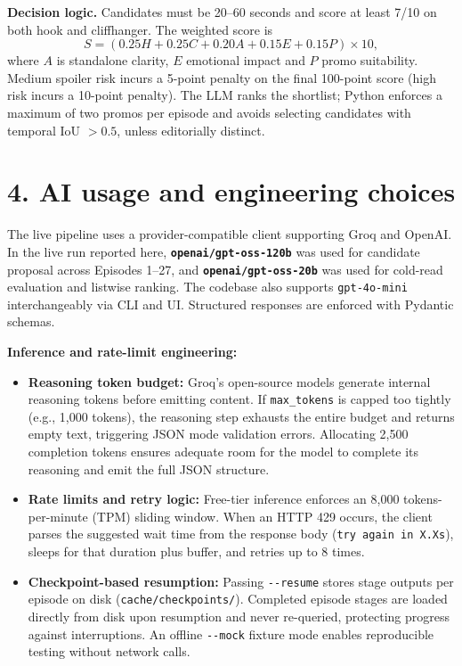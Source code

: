 \documentclass[10pt,a4paper]{extarticle}
\begin{document}
\textbf{Decision logic.} Candidates must be 20--60 seconds and score at least 7/10 on both hook and cliffhanger. The weighted score is
\[
S = (0.25H + 0.25C + 0.20A + 0.15E + 0.15P)\times 10,
\]
where \(A\) is standalone clarity, \(E\) emotional impact and \(P\) promo suitability. Medium spoiler risk incurs a 5-point penalty on the final 100-point score (high risk incurs a 10-point penalty). The LLM ranks the shortlist; Python enforces a maximum of two promos per episode and avoids selecting candidates with temporal IoU \(>0.5\), unless editorially distinct.

\section{4. AI usage and engineering choices}
The live pipeline uses a provider-compatible client supporting Groq and OpenAI. In the live run reported here, \textbf{\texttt{openai/gpt-oss-120b}} was used for candidate proposal across Episodes 1--27, and \textbf{\texttt{openai/gpt-oss-20b}} was used for cold-read evaluation and listwise ranking. The codebase also supports \texttt{gpt-4o-mini} interchangeably via CLI and UI. Structured responses are enforced with Pydantic schemas.

\textbf{Inference and rate-limit engineering:}
\begin{itemize}[leftmargin=*, nosep]
    \item \textbf{Reasoning token budget:} Groq's open-source models generate internal reasoning tokens before emitting content. If \texttt{max\_tokens} is capped too tightly (e.g., 1,000 tokens), the reasoning step exhausts the entire budget and returns empty text, triggering JSON mode validation errors. Allocating 2,500 completion tokens ensures adequate room for the model to complete its reasoning and emit the full JSON structure.
    \item \textbf{Rate limits and retry logic:} Free-tier inference enforces an 8,000 tokens-per-minute (TPM) sliding window. When an HTTP 429 occurs, the client parses the suggested wait time from the response body (\texttt{try again in X.Xs}), sleeps for that duration plus buffer, and retries up to 8 times.
    \item \textbf{Checkpoint-based resumption:} Passing \texttt{-{}-resume} stores stage outputs per episode on disk (\texttt{cache/checkpoints/}). Completed episode stages are loaded directly from disk upon resumption and never re-queried, protecting progress against interruptions. An offline \texttt{-{}-mock} fixture mode enables reproducible testing without network calls.
\end{itemize}
\end{document}
